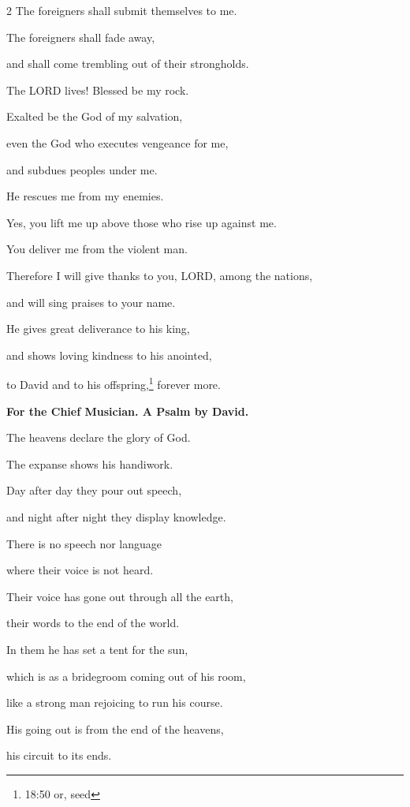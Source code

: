 \begin{multicols}{2}
	The foreigners shall submit themselves to me.
	
	
	\myverse{}The foreigners shall fade away,
	
	and shall come trembling out of their strongholds.
	
	
	\myverse{}The LORD lives! Blessed be my rock.
	
	Exalted be the God of my salvation,
	
	
	\myverse{}even the God who executes vengeance for me,
	
	and subdues peoples under me.
	
	
	\myverse{}He rescues me from my enemies.
	
	Yes, you lift me up above those who rise up against me.
	
	You deliver me from the violent man.
	
	
	\myverse{}Therefore I will give thanks to you, LORD, among the nations,
	
	and will sing praises to your name.
	
	
	\myverse{}He gives great deliverance to his king,
	
	and shows loving kindness to his anointed,
	
	to David and to his offspring,\footnote{18:50 or, seed} forever more.
	
	
	\mychapter{}\textbf{For the Chief Musician. A Psalm by David.}
	
	\quad \myverse*{}The heavens declare the glory of God.
	
	The expanse shows his handiwork.
	
	
	\myverse{}Day after day they pour out speech,
	
	and night after night they display knowledge.
	
	
	\myverse{}There is no speech nor language
	
	where their voice is not heard.
	
	
	\myverse{}Their voice has gone out through all the earth,
	
	their words to the end of the world.
	
	In them he has set a tent for the sun,
	
	
	\myverse{}which is as a bridegroom coming out of his room,
	
	like a strong man rejoicing to run his course.
	
	
	\myverse{}His going out is from the end of the heavens,
	
	his circuit to its ends.
	

\end{multicols}
